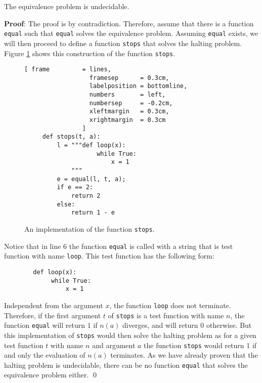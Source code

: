 \begin{Theorem}
The equivalence problem is undecidable.  
\end{Theorem}

\noindent
\textbf{Proof}:
The proof is by contradiction.  Therefore, assume that there is a function \texttt{equal}
such that \texttt{equal} solves the equivalence problem.  Assuming \texttt{equal} exists, we will
then proceed to define a function \texttt{stops} that solves the halting problem.
Figure \ref{fig:stops} shows this construction of the function \texttt{stops}.


\begin{figure}[!h]
  \centering
\begin{Verbatim}[ frame         = lines, 
                  framesep      = 0.3cm, 
                  labelposition = bottomline,
                  numbers       = left,
                  numbersep     = -0.2cm,
                  xleftmargin   = 0.3cm,
                  xrightmargin  = 0.3cm
                ]
     def stops(t, a):
         l = """def loop(x): 
                    while True:
                        x = 1
             """ 
         e = equal(l, t, a);
         if e == 2:
             return 2
         else:
             return 1 - e
\end{Verbatim}
  \vspace*{-0.3cm}
  \caption{An implementation of the function \texttt{stops}.}
  \label{fig:stops}
\end{figure}

Notice that in line 6 the function \texttt{equal} is called with a string that is test function with
name \texttt{loop}.  This test function has the following form:
\begin{verbatim}
        def loop(x): 
             while True:
                 x = 1
\end{verbatim}
Independent from the argument $x$, the function \texttt{loop} does not terminate.
Therefore, if the first argument $t$ of \texttt{stops} is a test function with name $n$, 
the function \texttt{equal} will return $1$ if $n(a)$ diverges, and will return $0$ otherwise.
But this implementation of \texttt{stops} would then solve the halting problem as
for a given test function $t$ with name $n$ and argument $a$ the function \texttt{stops} would
return 1 if and only the evaluation of $n(a)$ terminates.  As we have already proven that the
halting problem is undecidable, there can be no function \texttt{equal} that solves the equivalence
problem either.
\qed

